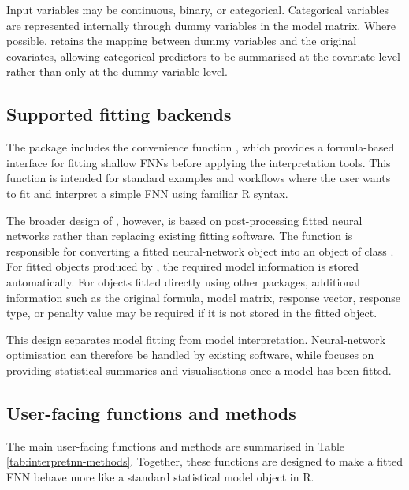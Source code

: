 Input variables may be continuous, binary, or categorical.
Categorical variables are represented internally through dummy variables in the model matrix.
Where possible,  retains the mapping between dummy variables and the original covariates, allowing categorical predictors to be summarised at the covariate level rather than only at the dummy-variable level.

\subsection{Supported fitting backends}\label{supported-fitting-backends}

The package includes the convenience function , which provides a formula-based interface for fitting shallow FNNs before applying the interpretation tools.
This function is intended for standard examples and workflows where the user wants to fit and interpret a simple FNN using familiar R syntax.

The broader design of , however, is based on post-processing fitted neural networks rather than replacing existing fitting software.
The function  is responsible for converting a fitted neural-network object into an object of class .
For fitted objects produced by , the required model information is stored automatically.
For objects fitted directly using other packages, additional information such as the original formula, model matrix, response vector, response type, or penalty value may be required if it is not stored in the fitted object.

This design separates model fitting from model interpretation.
Neural-network optimisation can therefore be handled by existing software, while  focuses on providing statistical summaries and visualisations once a model has been fitted.

\subsection{User-facing functions and methods}\label{user-facing-functions-and-methods}

The main user-facing functions and methods are summarised in Table \ref{tab:interpretnn-methods}.
Together, these functions are designed to make a fitted FNN behave more like a standard statistical model object in R.

